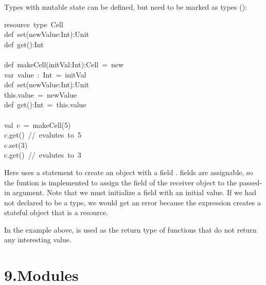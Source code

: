 \documentclass{article}
\begin{document}
\noindent{}Types with mutable state can be defined, but need to be marked as
 types ():%
\begin{mdpre}%
\noindent resource~type~Cell\\
def~set(newValue:Int):Unit\\
def~get():Int\\
\\
def~makeCell(initVal:Int):Cell~=~new\\
var~value~:~Int~=~initVal\\
def~set(newValue:Int):Unit\\
this.value~=~newValue\\
def~get():Int~=~this.value\\
\\
val~c~=~makeCell(5)\\
c.get()~//~evalutes~to~5\\
c.set(3)\\
c.get()~//~evalutes~to~3%
\end{mdpre}\noindent{}Here  uses a  statement to create an object with a 
field .   fields are assignable, so the  funtion is
implemented to assign the  field of the receiver object  to
the passed-in argument.  Note that we must initialize a  field with
an initial value.  If we had not declared  to be a 
type, we would get an error because the  expression creates a
stateful object that is a resource.

In the example above,  is used as the return type of functions
that do not return any interesting value.%

\section{9.\hspace*{0.5em}Modules}\label{sec-modules}%
\end{document}
